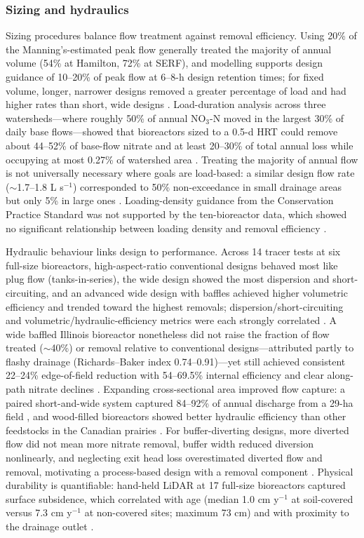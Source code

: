 \subsubsection{Sizing and hydraulics}

Sizing procedures balance flow treatment against removal efficiency. Using 20\% of the Manning's-estimated peak flow generally treated the majority of annual volume (54\% at Hamilton, 72\% at SERF), and modelling supports design guidance of 10--20\% of peak flow at 6--8-h design retention times; for fixed volume, longer, narrower designs removed a greater percentage of load and had higher rates than short, wide designs \parencite{Christianson2013}. Load-duration analysis across three watersheds---where roughly 50\% of annual NO$_3$-N moved in the largest 30\% of daily base flows---showed that bioreactors sized to a 0.5-d HRT could remove about 44--52\% of base-flow nitrate and at least 20--30\% of total annual loss while occupying at most 0.27\% of watershed area \parencite{Moorman2015}. Treating the majority of annual flow is not universally necessary where goals are load-based: a similar design flow rate ($\sim$1.7--1.8 L s$^{-1}$) corresponded to 50\% non-exceedance in small drainage areas but only 5\% in large ones \parencite{Christianson2025}. Loading-density guidance from the Conservation Practice Standard was not supported by the ten-bioreactor data, which showed no significant relationship between loading density and removal efficiency \parencite{Christianson2026}.

Hydraulic behaviour links design to performance. Across 14 tracer tests at six full-size bioreactors, high-aspect-ratio conventional designs behaved most like plug flow (tanks-in-series), the wide design showed the most dispersion and short-circuiting, and an advanced wide design with baffles achieved higher volumetric efficiency and trended toward the highest removals; dispersion/short-circuiting and volumetric/hydraulic-efficiency metrics were each strongly correlated \parencite{deOliveira2023}. A wide baffled Illinois bioreactor nonetheless did not raise the fraction of flow treated ($\sim$40\%) or removal relative to conventional designs---attributed partly to flashy drainage (Richards--Baker index 0.74--0.91)---yet still achieved consistent 22--24\% edge-of-field reduction with 54--69.5\% internal efficiency and clear along-path nitrate declines \parencite{Dougherty2020b}. Expanding cross-sectional area improved flow capture: a paired short-and-wide system captured 84--92\% of annual discharge from a 29-ha field \parencite{Maxwell2022}, and wood-filled bioreactors showed better hydraulic efficiency than other feedstocks in the Canadian prairies \parencite{Kohn2023}. For buffer-diverting designs, more diverted flow did not mean more nitrate removal, buffer width reduced diversion nonlinearly, and neglecting exit head loss overestimated diverted flow and removal, motivating a process-based design with a removal component \parencite{Abdalaal2023}. Physical durability is quantifiable: hand-held LiDAR at 17 full-size bioreactors captured surface subsidence, which correlated with age (median 1.0 cm y$^{-1}$ at soil-covered versus 7.3 cm y$^{-1}$ at non-covered sites; maximum 73 cm) and with proximity to the drainage outlet \parencite{Christianson2025b}.

